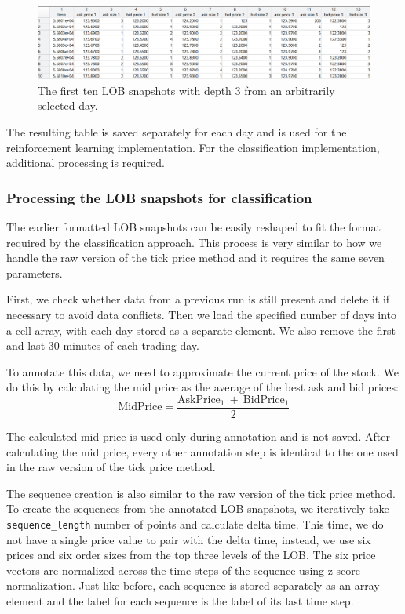\documentclass[a4paper,oneside,onecolumn,12pt]{book}
\begin{document}
			\begin{figure}[H]
			\begin{center}
				\includegraphics[width=\linewidth]{kep/formatted_lob.png}
				\caption{The first ten LOB snapshots with depth 3 from an arbitrarily selected day.}
				\label{fig:formatted_lob}
			\end{center}
			\end{figure}

			The resulting table is saved separately for each day and is used for the reinforcement learning implementation. For the classification implementation, additional processing is required.

		\subsubsection{Processing the LOB snapshots for classification}
		The earlier formatted LOB snapshots can be easily reshaped to fit the format required by the classification approach. This process is very similar to how we handle the raw version of the tick price method and it requires the same seven parameters.

		First, we check whether data from a previous run is still present and delete it if necessary to avoid data conflicts. Then we load the specified number of days into a cell array, with each day stored as a separate element. We also remove the first and last 30 minutes of each trading day.

		To annotate this data, we need to approximate the current price of the stock. We do this by calculating the mid price as the average of the best ask and bid prices:
		\[
		\text{MidPrice} = \frac{\text{AskPrice}_{1}\ +\ \text{BidPrice}_{1}}{2}
		\]

		The calculated mid price is used only during annotation and is not saved. After calculating the mid price, every other annotation step is identical to the one used in the raw version of the tick price method.

		The sequence creation is also similar to the raw version of the tick price method. To create the sequences from the annotated LOB snapshots, we iteratively take \texttt{sequence\_length} number of points and calculate delta time. This time, we do not have a single price value to pair with the delta time, instead, we use six prices and six order sizes from the top three levels of the LOB. The six price vectors are normalized across the time steps of the sequence using z-score normalization. Just like before, each sequence is stored separately as an array element and the label for each sequence is the label of its last time step.
\end{document}
